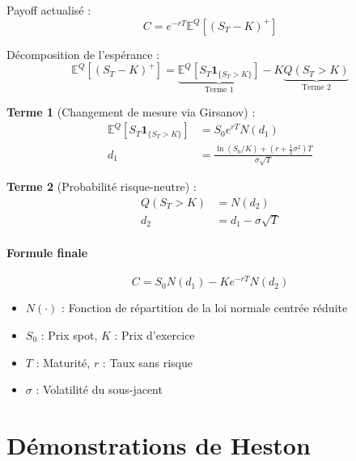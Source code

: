 Payoff actualisé :
\begin{equation}
    C = e^{-rT} \mathbb{E}^Q\left[(S_T - K)^+\right]
\end{equation}

Décomposition de l'espérance :
\begin{equation}
    \mathbb{E}^Q\left[(S_T - K)^+\right] = \underbrace{\mathbb{E}^Q\left[S_T \mathbf{1}_{\{S_T > K\}}\right]}_{\text{Terme 1}} - K \underbrace{Q(S_T > K)}_{\text{Terme 2}}
\end{equation}


\textbf{Terme 1} (Changement de mesure via Girsanov) :
\begin{align}
    \mathbb{E}^Q\left[S_T \mathbf{1}_{\{S_T > K\}}\right] &= S_0 e^{rT} N(d_1) \\
    d_1 &= \frac{\ln(S_0/K) + (r + \frac{1}{2}\sigma^2)T}{\sigma\sqrt{T}}
\end{align}

\textbf{Terme 2} (Probabilité risque-neutre) :
\begin{align}
    Q(S_T > K) &= N(d_2) \\
    d_2 &= d_1 - \sigma\sqrt{T}
\end{align}

\subsubsection*{Formule finale}
\begin{equation}
    \boxed{
    C = S_0 N(d_1) - Ke^{-rT}N(d_2)
    }
\end{equation}

\begin{itemize}
    \item \( N(\cdot) \) : Fonction de répartition de la loi normale centrée réduite
    \item \( S_0 \) : Prix spot, \( K \) : Prix d'exercice
    \item \( T \) : Maturité, \( r \) : Taux sans risque
    \item \( \sigma \) : Volatilité du sous-jacent
\end{itemize}



\chapter{Démonstrations de Heston}
